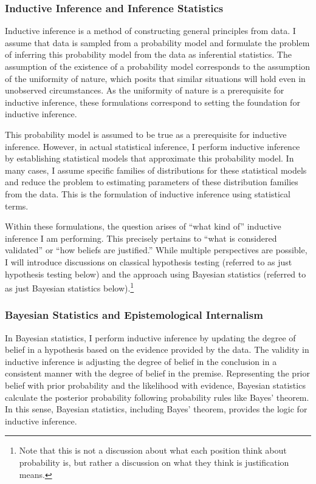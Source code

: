 \subsubsection{Inductive Inference and Inference Statistics}

Inductive inference is a method of constructing general principles from data. I assume that data is sampled from a probability model and formulate the problem of inferring this probability model from the data as inferential statistics. The assumption of the existence of a probability model corresponds to the assumption of the uniformity of nature, which posits that similar situations will hold even in unobserved circumstances. As the uniformity of nature is a prerequisite for inductive inference, these formulations correspond to setting the foundation for inductive inference.

This probability model is assumed to be true as a prerequisite for inductive inference. However, in actual statistical inference, I perform inductive inference by establishing statistical models that approximate this probability model. In many cases, I assume specific families of distributions for these statistical models and reduce the problem to estimating parameters of these distribution families from the data. This is the formulation of inductive inference using statistical terms.

Within these formulations, the question arises of ``what kind of'' inductive inference I am performing. This precisely pertains to ``what is considered validated'' or ``how beliefs are justified.'' While multiple perspectives are possible, I will introduce discussions on classical hypothesis testing (referred to as just hypothesis testing below) and the approach using Bayesian statistics (referred to as just Bayesian statistics below).\footnote{
Note that this is not a discussion about what each position think about probability is, but rather a discussion on what they think is justification means.
}

\subsubsection{Bayesian Statistics and Epistemological Internalism}
In Bayesian statistics, I perform inductive inference by updating the degree of belief in a hypothesis based on the evidence provided by the data. The validity in inductive inference is adjusting the degree of belief in the conclusion in a consistent manner with the degree of belief in the premise. Representing the prior belief with prior probability and the likelihood with evidence, Bayesian statistics calculate the posterior probability following probability rules like Bayes' theorem. In this sense, Bayesian statistics, including Bayes' theorem, provides the logic for inductive inference. 

